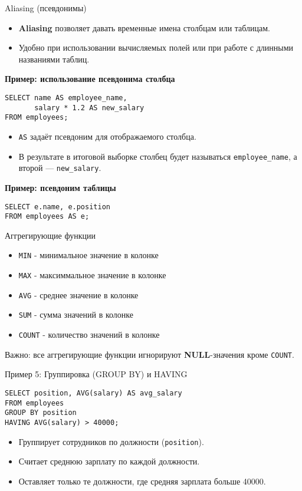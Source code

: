 \documentclass{beamer}
\begin{document}
\begin{frame}[fragile]{Aliasing (псевдонимы)}
	\begin{itemize}
		\item \textbf{Aliasing} позволяет давать временные имена столбцам или таблицам.
		\item Удобно при использовании вычисляемых полей или при работе с длинными названиями таблиц.
	\end{itemize}

	\textbf{Пример: использование псевдонима столбца}
	\begin{verbatim}
SELECT name AS employee_name,
       salary * 1.2 AS new_salary
FROM employees;
\end{verbatim}
	\begin{itemize}
		\item \texttt{AS} задаёт псевдоним для отображаемого столбца.
		\item В результате в итоговой выборке столбец будет называться \texttt{employee\_name},
		      а второй --- \texttt{new\_salary}.
	\end{itemize}

	\textbf{Пример: псевдоним таблицы}
	\begin{verbatim}
SELECT e.name, e.position
FROM employees AS e;
\end{verbatim}
\end{frame}

\begin{frame}[fragile]{Аггрегирующие функции}
	\begin{itemize}
		\item \texttt{MIN} - минимальное значение в колонке
		\item \texttt{MAX} - максиммальное значение в колонке
		\item \texttt{AVG} - среднее значение в колонке
		\item \texttt{SUM} - сумма значений в колонке
		\item \texttt{COUNT} - количество значений в колонке
	\end{itemize}
	Важно: все аггрегирующие функции игнорируют \textbf{NULL}-значения кроме \texttt{COUNT}.
\end{frame}

\begin{frame}[fragile]{Пример 5: Группировка (GROUP BY) и HAVING}
	\begin{verbatim}
SELECT position, AVG(salary) AS avg_salary
FROM employees
GROUP BY position
HAVING AVG(salary) > 40000;
\end{verbatim}
	\begin{itemize}
		\item Группирует сотрудников по должности (\texttt{position}).
		\item Считает среднюю зарплату по каждой должности.
		\item Оставляет только те должности, где средняя зарплата больше 40000.
	\end{itemize}
\end{frame}
\end{document}
